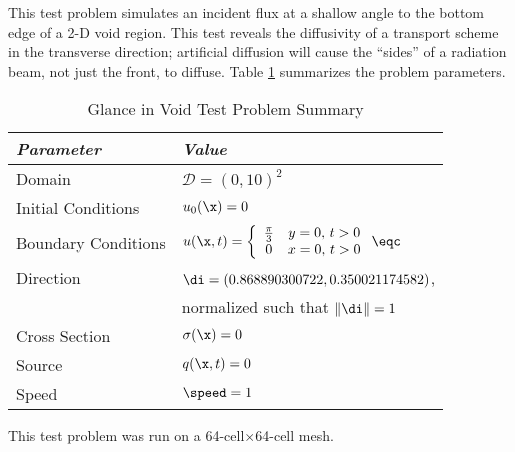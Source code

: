 This test problem simulates an incident flux at a shallow angle to
the bottom edge of a 2-D void region.
This test reveals the diffusivity of a transport scheme in the transverse
direction; artificial diffusion will cause the ``sides'' of a radiation beam,
not just the front, to diffuse.
Table \ref{tab:glance_in_void} summarizes the problem parameters.

\begin{table}[htb]\caption{Glance in Void Test Problem Summary}
\label{tab:glance_in_void}
\centering
\begin{tabular}{l l}\toprule
\emph{Parameter} & \emph{Value}\\\midrule
Domain & $\mathcal{D} = (0,10)^2$\\
Initial Conditions & $u_0(\x)=0$\\
Boundary Conditions & $u(\x,t)=\left\{\begin{array}{c c}
  \frac{\pi}{3} & y = 0, \, t > 0\\
  0             & x = 0, \, t > 0
  \end{array}\right. \eqc$\\
Direction & $\di = (0.868890300722,0.350021174582)$,\\
          & normalized such that $\|\di\| = 1$\\
Cross Section & $\sigma(\x)=0$\\
Source & $q(\x,t)=0$\\
Speed & $\speed=1$\\
\bottomrule\end{tabular}
\end{table}

This test problem was run on a 64-cell$\times$64-cell mesh.



